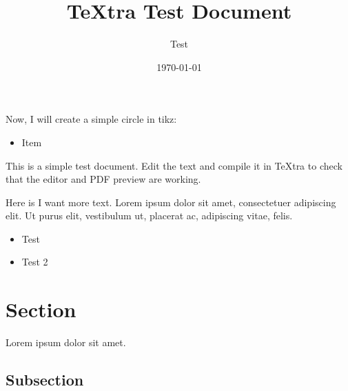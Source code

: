 \documentclass{article}
\title{TeXtra Test Document}
\author{Test}
\date{\today}
\begin{document}
\maketitle

\begin{figure}
	\centering
	\caption{Supply and Demand Graph}
	\label{fig:supply-demand}
	\caption{}\label{fig:fig1}
\end{figure}

Now, I will create a simple circle in tikz:
\begin{figure}
	\centering
	\caption{}\label{fig:fig2}
\end{figure}


\begin{itemize}
	\item Item
\end{itemize}

This is a simple test document. Edit the text and compile it in TeXtra to check that the editor and PDF preview are working.

Here is I want more text. Lorem ipsum dolor sit amet, consectetuer adipiscing elit. Ut purus elit, vestibulum ut, placerat ac, adipiscing vitae, felis.
	
\begin{itemize}
	\item Test
	\item Test 2
\end{itemize}

\section{Section}
Lorem ipsum dolor sit amet.

\subsection{Subsection}
\end{document}
